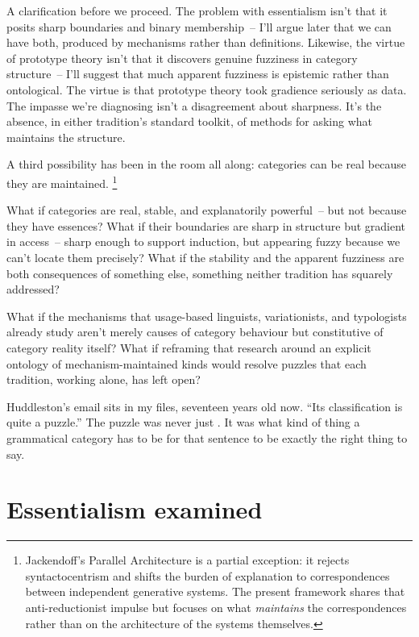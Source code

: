 A clarification before we proceed. The problem with essentialism isn't that it posits sharp boundaries and binary membership~-- I'll argue later that we can have both, produced by mechanisms rather than definitions. Likewise, the virtue of prototype theory isn't that it discovers genuine fuzziness in category structure~-- I'll suggest that much apparent fuzziness is epistemic rather than ontological. The virtue is that prototype theory took gradience seriously as data. The impasse we're diagnosing isn't a disagreement about sharpness. It's the absence, in either tradition's standard toolkit, of methods for asking what maintains the structure.

A third possibility has been in the room all along: categories can be real because they are maintained.%
\footnote{Jackendoff's Parallel Architecture \parencite{jackendoff2002, jackendoff2023parallel} is a partial exception: it rejects syntactocentrism and shifts the burden of explanation to correspondences between independent generative systems. The present framework shares that anti-reductionist impulse but focuses on what \emph{maintains} the correspondences rather than on the architecture of the systems themselves.}

What if categories are real, stable, and explanatorily powerful~-- but not because they have essences? What if their boundaries are sharp in structure but gradient in access~-- sharp enough to support induction, but appearing fuzzy because we can't locate them precisely? What if the stability and the apparent fuzziness are both consequences of something else, something neither tradition has squarely addressed?

What if the mechanisms that usage-based linguists, variationists, and typologists already study aren't merely causes of category behaviour but constitutive of category reality itself? What if reframing that research around an explicit ontology of mechanism-maintained kinds would resolve puzzles that each tradition, working alone, has left open?

Huddleston's email sits in my files, seventeen years old now. \enquote{Its classification is quite a puzzle.} The puzzle was never just . It was what kind of thing a grammatical category has to be for that sentence to be exactly the right thing to say.


\section{Essentialism examined}
\label{sec:1:essentialism}

